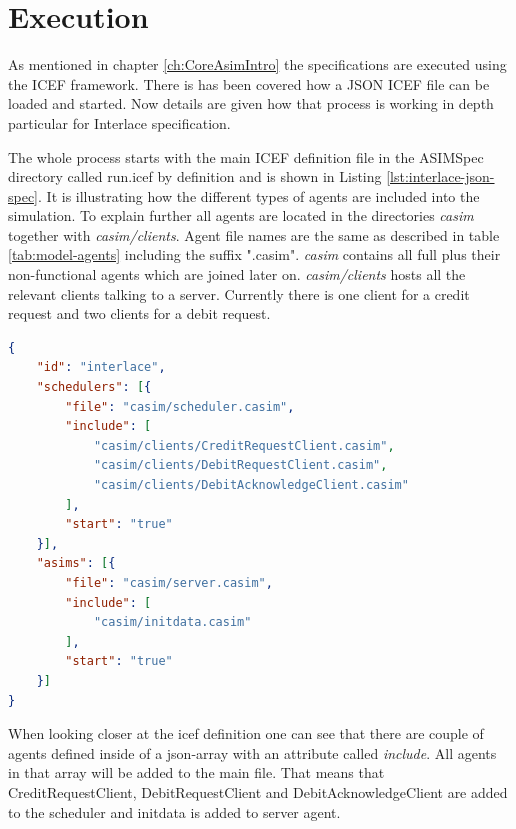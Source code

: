 \section{Execution}

As mentioned in chapter \ref{ch:CoreAsimIntro} the specifications are executed using the ICEF framework. There is has been covered how a JSON ICEF file can be loaded and started. Now details are given how that process is working in depth particular for Interlace specification.

The whole process starts with the main ICEF definition file in the ASIMSpec directory called run.icef by definition and is shown in Listing \ref{lst:interlace-json-spec}. It is illustrating how the different types of agents are included into the simulation. To explain further all agents are located in the directories \textit{casim} together with \textit{casim/clients}. Agent file names are the same as described in table \ref{tab:model-agents} including the suffix ".casim". \textit{casim} contains all full plus their non-functional agents which are joined later on. \textit{casim/clients} hosts all the relevant clients talking to a server. Currently there is one client for a credit request and two clients for a debit request.

\begin{center}
\begin{minipage}{0.8\textwidth}
\small
\begin{lstlisting}[language=json,firstnumber=1,caption={\bf\small ICEF JSON Specification for INTERLACE},captionpos=b,label=lst:interlace-json-spec]
{
    "id": "interlace", 
    "schedulers": [{
        "file": "casim/scheduler.casim",
        "include": [
            "casim/clients/CreditRequestClient.casim",
            "casim/clients/DebitRequestClient.casim",
            "casim/clients/DebitAcknowledgeClient.casim"
        ],
        "start": "true"
    }],
    "asims": [{
        "file": "casim/server.casim",
        "include": [
            "casim/initdata.casim"
        ],
        "start": "true"
    }]
}
\end{lstlisting}
\end{minipage}
\end{center}

When looking closer at the icef definition one can see that there are couple of agents defined inside of a json-array with an attribute called \textit{include}. All agents in that array will be added to the main file. That means that CreditRequestClient, DebitRequestClient and DebitAcknowledgeClient are added to the scheduler and initdata is added to server agent.

